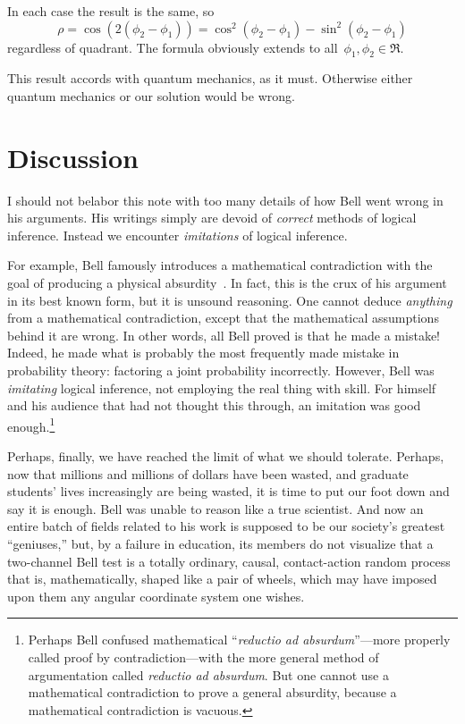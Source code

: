 \documentclass[9pt,technote]{IEEEtran}
\begin{document}
In each case the result is the same, so
\begin{equation}
  \rho = \cos(2(\phi_2-\phi_1)) = \cos^2(\phi_2-\phi_1) - \sin^2(\phi_2-\phi_1)
\end{equation}
regardless of quadrant. The formula obviously extends to
all~$\phi_1,\phi_2\in\Re$.

This result accords with quantum mechanics, as it must. Otherwise
either quantum mechanics or our solution would be wrong.

\section{Discussion}

I should not belabor this note with too many details of how Bell went
wrong in his arguments. His writings simply are devoid of
{\em{correct}} methods of logical inference. Instead we encounter
{\em{imitations}} of logical inference.

For example, Bell famously introduces a mathematical contradiction
with the goal of producing a physical
absurdity~\cite{bertlmann:manuscript}. In fact, this is the crux of
his argument in its best known form, but it is unsound reasoning. One
cannot deduce {\em{anything}} from a mathematical contradiction,
except that the mathematical assumptions behind it are wrong. In other
words, all Bell proved is that he made a mistake! Indeed, he made what
is probably the most frequently made mistake in probability theory:
factoring a joint probability incorrectly. However, Bell was
{\em{imitating}} logical inference, not employing the real thing with
skill. For himself and his audience that had not thought this through,
an imitation was good enough.\footnote{Perhaps Bell confused
  mathematical ``{\em{reductio ad absurdum}}''---more properly called
  proof by contradiction---with the more general method of
  argumentation called {\em{reductio ad absurdum}}. But one cannot use
  a mathematical contradiction to prove a general absurdity, because a
  mathematical contradiction is vacuous.}

Perhaps, finally, we have reached the limit of what we should
tolerate. Perhaps, now that millions and millions of dollars have been
wasted, and graduate students' lives increasingly are being wasted, it
is time to put our foot down and say it is enough. Bell was unable to
reason like a true scientist. And now an entire batch of fields
related to his work is supposed to be our society’s greatest
``geniuses,'' but, by a failure in education, its members do not
visualize that a two-channel Bell test is a totally ordinary, causal,
contact-action random process that is, mathematically, shaped like a
pair of wheels, which may have imposed upon them any angular
coordinate system one wishes.
\end{document}
